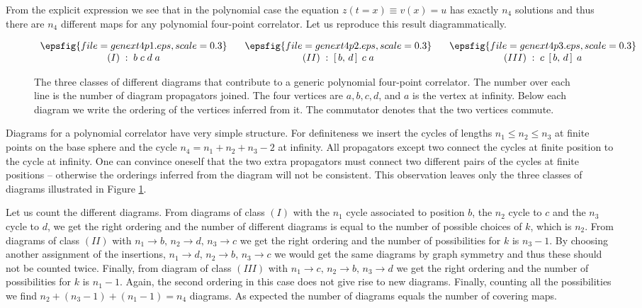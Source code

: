 \documentclass[letterpaper]{JHEP3}
\begin{document}
From the explicit expression we see that in the polynomial case the equation $z(t=x)\equiv v(x) = u$
has exactly $n_4$ solutions and thus there are $n_4$ different maps for any polynomial four-point correlator.
Let us  reproduce this result diagrammatically. 
\begin{figure}[htbp]
\begin{center}
$\begin{array}{c@{\hspace{0.25in}}c@{\hspace{0.25in}}c}
 \epsfig{file=genext4p1.eps,scale=0.3} & \epsfig{file=genext4p2.eps,scale=0.3}&\epsfig{file=genext4p3.eps,scale=0.3}\\
(I)\;:\;b\;c\;d\;a &(II)\;:\; \left[\,b,\,d\,\right]\;c\;a&(III)\;:\;c\;\left[\,b,\,d\,\right]\;a  
\\\end{array}$
\end{center}
 \begin{center}
\caption{The three classes of different diagrams that contribute to a generic polynomial four-point correlator. The number over each line is the number 
of diagram propagators joined. The four vertices are $a,b,c,d$, and $a$ is the vertex at infinity. Below each diagram we write the
ordering of the vertices inferred from it. The commutator denotes that the two vertices commute.
 } \label{genext4p}
\end{center}
\end{figure}    

 Diagrams for a polynomial correlator have very simple structure.
For definiteness we insert the cycles of lengths $n_1\leq n_2\leq n_3$  at finite points  on the base sphere
and the cycle $n_4=n_1+n_2+n_3-2$
 at infinity.
All  
propagators except two connect the cycles at finite position to the cycle at infinity. One can convince oneself 
that the two extra propagators must connect two different pairs 
of the cycles at finite positions --  otherwise the
orderings inferred from the diagram will not be consistent. This observation leaves only the three classes of diagrams
illustrated in Figure \ref{genext4p}.

Let us count the different diagrams. From diagrams of class $(I)$ with the $n_1$ cycle associated to position
 $b$, the $n_2$ cycle to $c$ and the $n_3$ cycle to $d$, we get 
the right ordering and the number of different diagrams is equal to the number of possible choices of $k$, which is $n_2$.
From diagrams of class $(II)$  with $n_1\to b,\,n_2\to d,\,n_3\to c$ we get the right ordering and the number of possibilities for $k$
is $n_3-1$. By choosing another assignment of the insertions, $n_1\to d,\,n_2\to b,\,n_3\to c$ we would get the same diagrams 
by graph symmetry and thus these should not be counted twice. Finally, from diagram of class $(III)$  
with $n_1\to c,\,n_2\to b,\,n_3\to d$ we get the right ordering and the number of possibilities for $k$
is $n_1-1$. Again, the second ordering in this case does not give rise to new diagrams. Finally, counting all the possibilities
we find  $n_2+(n_3-1)+(n_1-1)=n_4$ diagrams. As expected the number of diagrams equals the number of covering maps.
\end{document}
